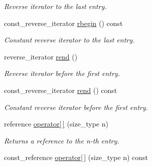 \begin{DoxyCompactItemize}
\begin{DoxyCompactList}\small\item\em Reverse iterator to the last entry. \end{DoxyCompactList}\item 
\hypertarget{a00579_a8b3a43bed52bd94b9b316b0f54bf9507}{}const\+\_\+reverse\+\_\+iterator \hyperlink{a00579_a8b3a43bed52bd94b9b316b0f54bf9507}{rbegin} () const \label{a00579_a8b3a43bed52bd94b9b316b0f54bf9507}

\begin{DoxyCompactList}\small\item\em Constant reverse iterator to the last entry. \end{DoxyCompactList}\item 
\hypertarget{a00579_af1a4fa46f9ad970fb1da40b28bf78ff6}{}reverse\+\_\+iterator \hyperlink{a00579_af1a4fa46f9ad970fb1da40b28bf78ff6}{rend} ()\label{a00579_af1a4fa46f9ad970fb1da40b28bf78ff6}

\begin{DoxyCompactList}\small\item\em Reverse iterator before the first entry. \end{DoxyCompactList}\item 
\hypertarget{a00579_ae9859e5f386ba4c0cd01c5f1388e8e5f}{}const\+\_\+reverse\+\_\+iterator \hyperlink{a00579_ae9859e5f386ba4c0cd01c5f1388e8e5f}{rend} () const \label{a00579_ae9859e5f386ba4c0cd01c5f1388e8e5f}

\begin{DoxyCompactList}\small\item\em Constant reverse iterator before the first entry. \end{DoxyCompactList}\item 
\hypertarget{a00579_a57f90aea63a18af2e15740127f279b14}{}reference \hyperlink{a00579_a57f90aea63a18af2e15740127f279b14}{operator\mbox{[}$\,$\mbox{]}} (size\+\_\+type n)\label{a00579_a57f90aea63a18af2e15740127f279b14}

\begin{DoxyCompactList}\small\item\em Returns a reference to the n-\/th entry. \end{DoxyCompactList}\item 
\hypertarget{a00579_a303651d3905dd51c370cc2ee9a725f4a}{}const\+\_\+reference \hyperlink{a00579_a303651d3905dd51c370cc2ee9a725f4a}{operator\mbox{[}$\,$\mbox{]}} (size\+\_\+type n) const \label{a00579_a303651d3905dd51c370cc2ee9a725f4a}


\end{DoxyCompactItemize}

